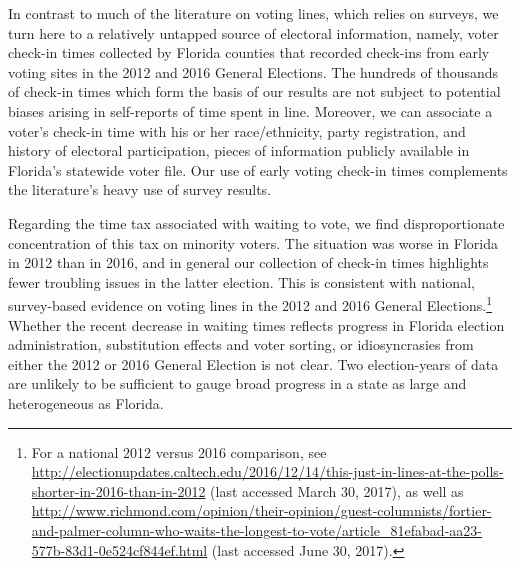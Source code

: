 \documentclass[12pt,titlepage]{article}
\begin{document}

In contrast to much of the literature on voting lines, which relies on
surveys, we turn here to a relatively untapped source of electoral
information, namely, voter check-in times collected by Florida
counties that recorded check-ins from early voting sites in the 2012
and 2016 General Elections.  The hundreds of thousands of check-in
times which form the basis of our results are not subject to potential
biases arising in self-reports of time spent in line.  Moreover, we
can associate a voter's check-in time with his or her race/ethnicity,
party registration, and history of electoral participation, pieces of
information publicly available in Florida's statewide voter file.  Our
use of early voting check-in times complements the literature's heavy
use of survey results.


Regarding the time tax associated with waiting to vote, we find
disproportionate concentration of this tax on minority voters.  The
situation was worse in Florida in 2012 than in 2016, and in general
our collection of check-in times highlights fewer troubling issues in
the latter election.  This is consistent with national, survey-based
evidence on voting lines in the 2012 and 2016 General
Elections.\footnote{For a national 2012 versus 2016 comparison, see
  \url{http://electionupdates.caltech.edu/2016/12/14/this-just-in-lines-at-the-polls-shorter-in-2016-than-in-2012}
  (last accessed March 30, 2017), as well as
  \url{http://www.richmond.com/opinion/their-opinion/guest-columnists/fortier-and-palmer-column-who-waits-the-longest-to-vote/article_81efabad-aa23-577b-83d1-0e524cf844ef.html}
  (last accessed June 30, 2017).}  Whether the recent decrease in
waiting times reflects progress in Florida election administration,
substitution effects and voter sorting, or idiosyncrasies from either
the 2012 or 2016 General Election is not clear.  Two election-years of
data are unlikely to be sufficient to gauge broad progress in a state
as large and heterogeneous as Florida.
\end{document}
